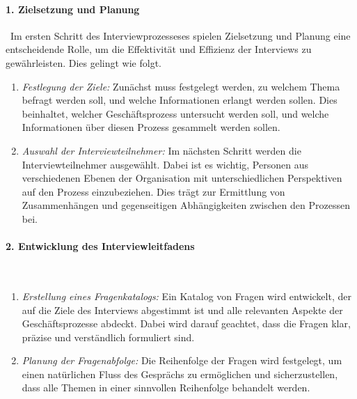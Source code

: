\paragraph{1. Zielsetzung und Planung}\
Im ersten Schritt des Interviewprozesseses spielen Zielsetzung und Planung eine entscheidende Rolle, um die Effektivität und Effizienz der Interviews zu gewährleisten. Dies gelingt wie folgt.
\begin{enumerate}
    \item \textit{Festlegung der Ziele:} Zunächst muss festgelegt werden, zu welchem Thema befragt werden soll, und welche Informationen erlangt werden sollen. Dies beinhaltet, welcher Geschäftsprozess untersucht werden soll, und welche Informationen über diesen Prozess gesammelt werden sollen.
    \item \textit{Auswahl der Interviewteilnehmer:} Im nächsten Schritt werden die Interviewteilnehmer ausgewählt. Dabei ist es wichtig, Personen aus verschiedenen Ebenen der Organisation mit unterschiedlichen Perspektiven auf den Prozess einzubeziehen. Dies trägt zur Ermittlung von Zusammenhängen und gegenseitigen Abhängigkeiten zwischen den Prozessen bei.
\end{enumerate}

\paragraph{2. Entwicklung des Interviewleitfadens}\
\begin{enumerate}
\item \textit{Erstellung eines Fragenkatalogs:} Ein Katalog von Fragen wird entwickelt, der auf die Ziele des Interviews abgestimmt ist und alle relevanten Aspekte der Geschäftsprozesse abdeckt. Dabei wird darauf geachtet, dass die Fragen klar, präzise und verständlich formuliert sind.
\item \textit{Planung der Fragenabfolge:} Die Reihenfolge der Fragen wird festgelegt, um einen natürlichen Fluss des Gesprächs zu ermöglichen und sicherzustellen, dass alle Themen in einer sinnvollen Reihenfolge behandelt werden.
\end{enumerate}

